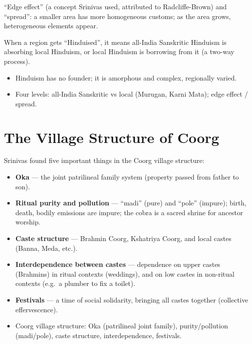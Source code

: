 \begin{KeyConcept}
``Edge effect'' (a concept Srinivas used, attributed to Radcliffe-Brown) and ``spread'': a smaller area has more homogeneous customs; as the area grows, heterogeneous elements appear.
\end{KeyConcept}

When a region gets ``Hinduised'', it means all-India Sanskritic Hinduism is absorbing local Hinduism, or local Hinduism is borrowing from it (a two-way process).

\begin{QuickRevision}
\begin{itemize}
\item Hinduism has no founder; it is amorphous and complex, regionally varied.
\item Four levels: all-India Sanskritic vs local (Murugan, Karni Mata); edge effect / spread.
\end{itemize}
\end{QuickRevision}

\section{The Village Structure of Coorg}

Srinivas found five important things in the Coorg village structure:
\begin{itemize}
\item \textbf{Oka} --- the joint patrilineal family system (property passed from father to son).
\item \textbf{Ritual purity and pollution} --- ``madi'' (pure) and ``pole'' (impure); birth, death, bodily emissions are impure; the cobra is a sacred shrine for ancestor worship.
\item \textbf{Caste structure} --- Brahmin Coorg, Kshatriya Coorg, and local castes (Banna, Meda, etc.).
\item \textbf{Interdependence between castes} --- dependence on upper castes (Brahmins) in ritual contexts (weddings), and on low castes in non-ritual contexts (e.g.\ a plumber to fix a toilet).
\item \textbf{Festivals} --- a time of social solidarity, bringing all castes together (collective effervescence).
\end{itemize}

\begin{QuickRevision}
\begin{itemize}
\item Coorg village structure: Oka (patrilineal joint family), purity/pollution (madi/pole), caste structure, interdependence, festivals.
\end{itemize}
\end{QuickRevision}

